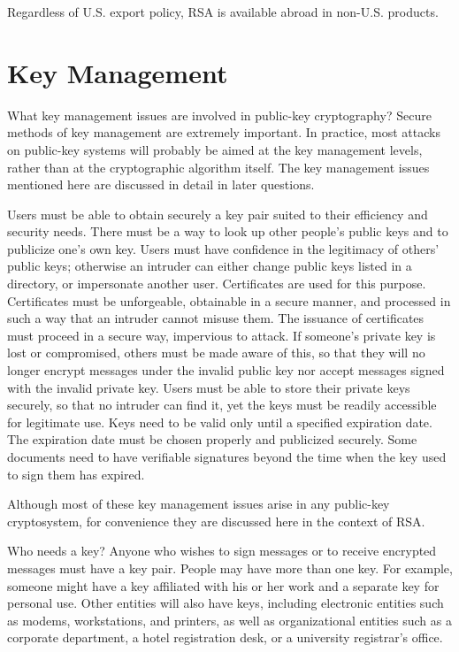 Regardless of U.S. export policy, RSA is available abroad in non-U.S.
products.

\section {Key Management} \label{s:a}
{What key management issues are involved in public-key cryptography?}
Secure methods of key management are extremely important. In practice,
most attacks on public-key systems will probably be aimed at the key 
management levels, rather than at the cryptographic algorithm itself. 
The key management issues mentioned here are discussed in detail in 
later questions.

Users must be able to obtain securely a key pair suited to their efficiency 
and security needs. There must be a way to look up other people's public 
keys and to publicize one's own key. Users must have confidence in the 
legitimacy of others' public keys; otherwise an intruder can either change 
public keys listed in a directory, or impersonate another user. Certificates 
are used for this purpose. Certificates must be unforgeable, obtainable in a 
secure manner, and processed in such a way that an intruder cannot misuse 
them. The issuance of certificates must proceed in a secure way, impervious to 
attack. If someone's private key is lost or compromised, others must be made 
aware of this, so that they will no longer encrypt messages under the 
invalid public key nor accept messages signed with the invalid private key. 
Users must be able to store their private keys securely, so that no intruder 
can find it, yet the keys must be readily accessible for legitimate use. Keys 
need to be valid only until a specified expiration date. The expiration date 
must be chosen properly and publicized securely. Some documents need to have 
verifiable signatures beyond the time when the key used to sign them has 
expired.

Although most of these key management issues arise in any public-key 
cryptosystem, for convenience they are discussed here in the context of RSA.

{Who needs a key?}
Anyone who wishes to sign messages or to receive encrypted messages must
have a key pair. People may have more than one key. For example, someone
might have a key affiliated with his or her work and a separate key for
personal use. Other entities will also have keys, including electronic 
entities such as modems, workstations, and printers, as well as 
organizational entities such as a corporate department, a hotel 
registration desk, or a university registrar's office. 


